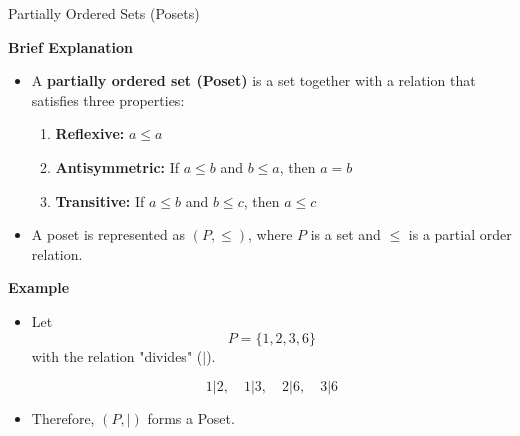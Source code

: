 \documentclass{beamer}
\begin{document}
\begin{frame}{Partially Ordered Sets (Posets)}

\textbf{Brief Explanation}

\begin{itemize}
    \item A \textbf{partially ordered set (Poset)} is a set together with a relation that satisfies three properties:
    \begin{enumerate}
        \item \textbf{Reflexive:} \(a \leq a\)
        \item \textbf{Antisymmetric:} If \(a \leq b\) and \(b \leq a\), then \(a=b\)
        \item \textbf{Transitive:} If \(a \leq b\) and \(b \leq c\), then \(a \leq c\)
    \end{enumerate}
    \item A poset is represented as \((P,\leq)\), where \(P\) is a set and \(\leq\) is a partial order relation.
\end{itemize}

\vspace{0.3cm}

\textbf{Example}

\begin{itemize}
    \item Let
    \[
    P=\{1,2,3,6\}
    \]
    with the relation "divides" (\(|\)).
    
    \[
    1|2,\quad 1|3,\quad 2|6,\quad 3|6
    \]
    
    \item Therefore, \((P,|)\) forms a Poset.
\end{itemize}

\end{frame}
\end{document}
